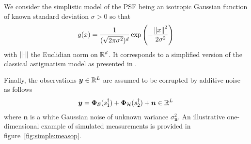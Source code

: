\documentclass[12pt]{article}
\begin{document}
            We consider the simplistic model of the PSF being an isotropic Gaussian function of known standard deviation $\sigma > 0$ so that
            \begin{equation}
                \label{eq:psf}
                g(x) = \frac{1}{(\sqrt{2\pi\sigma^2})^d} \exp\left({-\frac{\left\lVert x\right\rVert^2}{2 \sigma^2}}\right)
            \end{equation}
            with $\left\lVert\cdot\right\rVert$ the Euclidian norm on $\mathbb{R}^d$. It corresponds to a simplified version of the classical astigmatism model as presented in \cite{huang2017super,denoyelle2019sliding}.
            
            Finally, the observations $\bm{y} \in \mathbb{R}^{L}$ are assumed to be corrupted by additive noise as follows
            \begin{equation}
                \label{eq:ip-bis}
                \bm{y} = \bm{\Phi}_\mathcal{B}(s_1^\dagger) + \bm{\Phi}_\mathcal{H}(s_2^\dagger) + \bm{n} \in \mathbb{R}^L
            \end{equation}
            where $\bm{n}$ is a white Gaussian noise of unknown variance $\sigma_{\bm{n}}^2$.
            An illustrative one-dimensional example of simulated measurements is provided in figure~\ref{fig:simple:measop}.


        
\end{document}
